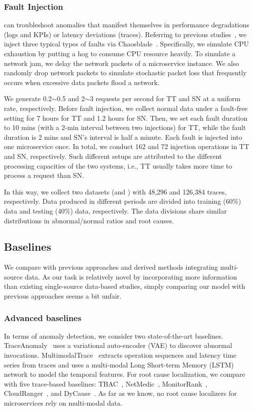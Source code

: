 \subsubsection{Fault Injection}
\name can troubleshoot anomalies that manifest themselves in performance degradations (logs and KPIs) or latency deviations (traces). Referring to previous studies~\cite{MicroRank, AutoMAP, DyCause}, we inject three typical types of faults via Chaosblade~\cite{Chaosblade}. 
Specifically, we simulate CPU exhaustion by putting a hog to consume CPU resource heavily. 
To simulate a network jam, we delay the network packets of a microservice instance. 
We also randomly drop network packets to simulate stochastic packet loss that frequently occurs when excessive data packets flood a network.

We generate 0.2$\sim$0.5 and 2$\sim$3 requests per second for TT and SN at a uniform rate, respectively.
Before fault injection, we collect normal data under a fault-free setting for 7 hours for TT and 1.2 hours for SN.
Then, we set each fault duration to 10 mins (with a 2-min interval between two injections) for TT, while the fault duration is 2 mins and SN's interval is half a minute. 
Each fault is injected into one microservice once.
In total, we conduct 162 and 72 injection operations in TT and SN, respectively.
Such different setups are attributed to the different processing capacities of the two systems, i.e., TT usually takes more time to process a request than SN.

In this way, we collect two datasets (\A and \B) with 48,296 and 126,384 traces, respectively. Data produced in different periods are divided into training (60\%) data and testing (40\%) data, respectively. The data divisions share similar distributions in abnormal/normal ratios and root causes.

\subsection{Baselines} 
We compare \name with previous approaches and derived methods integrating multi-source data. As our task is relatively novel by incorporating more information than existing single-source data-based studies, simply comparing our model with previous approaches seems a bit unfair.

\subsubsection{Advanced baselines} 
In terms of anomaly detection, we consider two state-of-the-art baselines.
TraceAnomaly~\cite{TraceAnomaly} uses a variational auto-encoder (VAE) to discover abnormal invocations. 
MultimodalTrace~\cite{MMTrace} extracts operation sequences and latency time series from traces and uses a multi-modal Long Short-term Memory (LSTM) network to model the temporal features.
For root cause localization, we compare \name with five trace-based baselines: TBAC~\cite{TBAC}, NetMedic~\cite{NetMedic}, MonitorRank~\cite{MonitorRank}, CloudRanger~\cite{CloudRanger}, and DyCause~\cite{DyCause}.
As far as we know, no root cause localizers for microservices rely on multi-modal data. 

